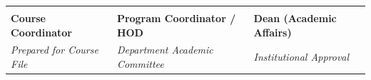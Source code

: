 \documentclass[10pt,a4paper]{article}
\begin{document}
\vspace{16pt}
\begin{table}[h!]
\centering
\begin{tabularx}{\textwidth}{Z Z Z}
\toprule
\vspace{20pt} & \vspace{20pt} & \vspace{20pt} \\
\textbf{Course Coordinator} & \textbf{Program Coordinator / HOD} & \textbf{Dean (Academic Affairs)} \\
\textit{Prepared for Course File} & \textit{Department Academic Committee} & \textit{Institutional Approval} \\
\bottomrule
\end{tabularx}
\end{table}
\end{document}
